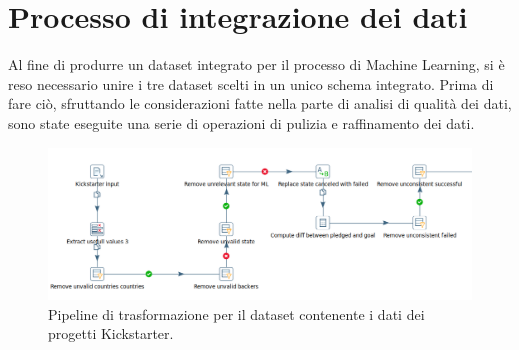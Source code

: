 \section{Processo di integrazione dei dati}
Al fine di produrre un dataset integrato per il processo di Machine Learning, si è reso necessario unire i tre dataset scelti in un unico schema integrato. Prima di fare ciò, sfruttando le considerazioni fatte nella parte di analisi di qualità dei dati, sono state eseguite una serie di operazioni di pulizia e raffinamento dei dati.\\

\begin{figure}
	\hspace*{-1cm}%
	\includegraphics[width=\dimexpr\textwidth+2cm\relax]{images/transformation_kick}%
	\hspace*{-1cm}%
	\caption{Pipeline di trasformazione per il dataset contenente i dati dei progetti Kickstarter.}
	\label{fig:transformationkick}
\end{figure}

